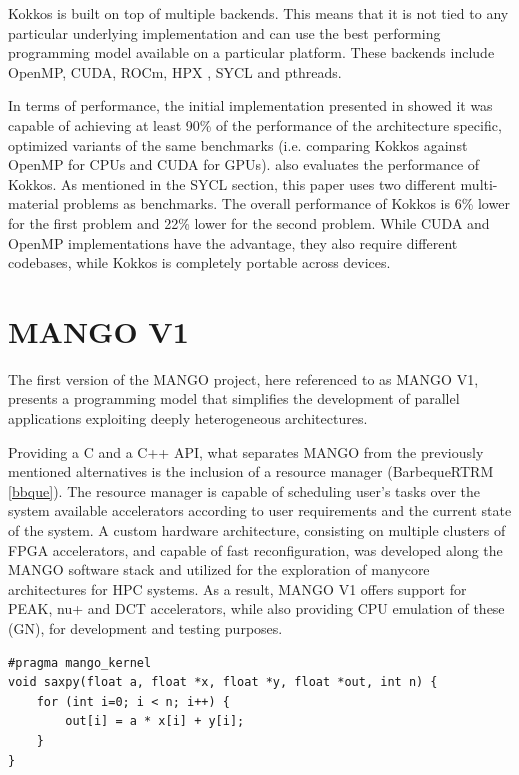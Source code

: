 Kokkos is built on top of multiple backends. This means that it is not tied to any particular underlying implementation and can use the best performing programming model available on a particular platform. These backends include OpenMP, CUDA, ROCm, HPX \cite{hpx}, SYCL and pthreads.

In terms of performance, the initial implementation presented in \cite{kokkos} showed it was capable of achieving at least 90\% of the performance of the architecture specific, optimized variants of the same benchmarks (i.e. comparing Kokkos against OpenMP for CPUs and CUDA for GPUs). \cite{performance_portability_multimaterial_kernels} also evaluates the performance of Kokkos. As mentioned in the SYCL section, this paper uses two different multi-material problems as benchmarks. The overall performance of Kokkos is 6\% lower for the first problem and 22\% lower for the second problem. While CUDA and OpenMP implementations have the advantage, they also require different codebases, while Kokkos is completely portable across devices.


\section{MANGO V1} \label{sect:mangov1}
The first version of the MANGO project, here referenced to as MANGO V1, presents a programming model that simplifies the development of parallel applications exploiting deeply heterogeneous architectures. 

Providing a C and a C++ API, what separates MANGO from the previously mentioned alternatives is the inclusion of a resource manager (BarbequeRTRM \ref{bbque}). The resource manager is capable of scheduling user's tasks over the system available accelerators according to user requirements and the current state of the system. 
A custom hardware architecture, consisting on multiple clusters of FPGA accelerators, and capable of fast reconfiguration, was developed along the MANGO software stack and utilized for the exploration of manycore architectures for HPC systems.
As a result, MANGO V1 offers support for PEAK, nu+ and DCT accelerators, while also providing CPU emulation of these (GN), for development and testing purposes.

\begin{lstlisting}[style=CStyle, caption=MANGO GN saxpy example (kernel), floatplacement=H, label={lst:mangov1_kernel_sample}]
#pragma mango_kernel
void saxpy(float a, float *x, float *y, float *out, int n) {
    for (int i=0; i < n; i++) {
	    out[i] = a * x[i] + y[i];
    }
}
\end{lstlisting}


